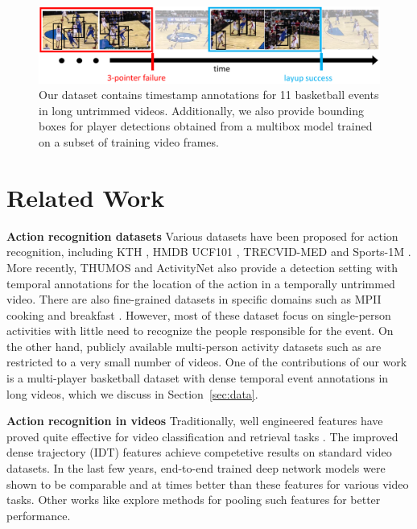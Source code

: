 
\begin{figure}[ht!]
  \includegraphics[width=6.5 in]{images/dataset_figure_cropped.pdf}
  \caption{Our dataset contains timestamp annotations for 11 basketball events
    in long untrimmed videos. Additionally, we also provide bounding boxes for player
    detections obtained from a multibox model trained on a subset of training
  video frames.}
\end{figure}



\section{Related Work}


\noindent \textbf{Action recognition datasets}
Various datasets have been proposed for action recognition,
including KTH \cite{KTH}, HMDB \cite{HMDB}
UCF101 \cite{UCF101}, TRECVID-MED \cite{MED11} and Sports-1M \cite{Karpathy_CVPR14}.
More recently, THUMOS \cite{THUMOS} and ActivityNet \cite{ActivityNet} also provide a detection
setting with temporal annotations for the location of the action in a temporally untrimmed video.
There are also fine-grained datasets
in specific domains such as MPII cooking \cite{Finegrained_cooking} and breakfast \cite{Breakfast}.
However, most of these dataset focus on single-person activities with little
need to recognize the people responsible for the event. On the other
hand, publicly available multi-person activity datasets 
such as \cite{Choi_ICCV09,Ryoo_10} are restricted
to a very small number of videos.  One of the contributions of our work is 
a multi-player basketball dataset with dense temporal event annotations in
long videos, which we discuss in Section~\ref{sec:data}.

\noindent \textbf{Action recognition in videos}
Traditionally, well engineered features have proved quite effective for video
classification and retrieval tasks
\cite{Dalal_ECCV06,Jain_CVPR13,Jiang_ECCV12,Laptev_CVPR08,
Niebels_ECCV10,Oh_MVA14,Oneata_ICCV13,Peng_ECCV14,Sadanand_CVPR12,Wang_BMVC09,Wang_CVPR11}.
The improved dense trajectory (IDT) features \cite{Wang_CVPR11} achieve
competetive results on standard video datasets.  In the last few years,
end-to-end trained deep network models
\cite{Ji_PAMI13,Karpathy_CVPR14,Simonyan_2014,Tran_arxiv14} were shown to be comparable and
at times better than these features for various video tasks.  Other works like
\cite{Xu_2015,Zha_2015,Wang_arxiv15} explore methods for pooling such
features for better performance.

